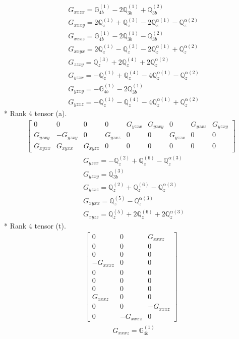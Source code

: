 \documentclass[fleqn,8pt,landscape]{jsarticle}
\begin{document}
\begin{align*}
& G_{xxzx} = \mathbb{G}_{4b}^{(1)} - 2 \mathbb{Q}_{3b}^{(1)} + \mathbb{Q}_{3b}^{(2)} \\
& G_{xxxy} = 2 \mathbb{Q}_{z}^{(1)} + \mathbb{Q}_{z}^{(3)} - 2 \mathbb{Q}_{z}^{\alpha(1)} - \mathbb{Q}_{z}^{\alpha(2)} \\
& G_{xxxz} = \mathbb{G}_{4b}^{(1)} - 2 \mathbb{Q}_{3b}^{(1)} - \mathbb{Q}_{3b}^{(2)} \\
& G_{xxyx} = 2 \mathbb{Q}_{z}^{(1)} - \mathbb{Q}_{z}^{(3)} - 2 \mathbb{Q}_{z}^{\alpha(1)} + \mathbb{Q}_{z}^{\alpha(2)} \\
& G_{zzxy} = \mathbb{Q}_{z}^{(3)} + 2 \mathbb{Q}_{z}^{(4)} + 2 \mathbb{Q}_{z}^{\alpha(2)} \\
& G_{yzzx} = - \mathbb{Q}_{z}^{(1)} + \mathbb{Q}_{z}^{(4)} - 4 \mathbb{Q}_{z}^{\alpha(1)} - \mathbb{Q}_{z}^{\alpha(2)} \\
& G_{yzxy} = - \mathbb{G}_{4b}^{(1)} - 2 \mathbb{Q}_{3b}^{(1)} \\
& G_{yzxz} = - \mathbb{Q}_{z}^{(1)} - \mathbb{Q}_{z}^{(4)} - 4 \mathbb{Q}_{z}^{\alpha(1)} + \mathbb{Q}_{z}^{\alpha(2)}
\end{align*}
* Rank 4 tensor (a).
\begin{align*}
\begin{bmatrix} 0 & 0 & 0 & 0 & G_{yzzx} & G_{yzxy} & 0 & G_{yzxz} & G_{yzxy} \\ G_{yzxy} & - G_{yzxy} & 0 & G_{yzxz} & 0 & 0 & G_{yzzx} & 0 & 0 \\ G_{xyxx} & G_{xyxx} & G_{xyzz} & 0 & 0 & 0 & 0 & 0 & 0 \end{bmatrix}
\end{align*}
\begin{align*}
& G_{yzzx} = - \mathbb{Q}_{z}^{(2)} + \mathbb{Q}_{z}^{(6)} - \mathbb{Q}_{z}^{\alpha(3)} \\
& G_{yzxy} = \mathbb{Q}_{3b}^{(3)} \\
& G_{yzxz} = \mathbb{Q}_{z}^{(2)} + \mathbb{Q}_{z}^{(6)} - \mathbb{Q}_{z}^{\alpha(3)} \\
& G_{xyxx} = \mathbb{Q}_{z}^{(5)} - \mathbb{Q}_{z}^{\alpha(3)} \\
& G_{xyzz} = \mathbb{Q}_{z}^{(5)} + 2 \mathbb{Q}_{z}^{(6)} + 2 \mathbb{Q}_{z}^{\alpha(3)}
\end{align*}
* Rank 4 tensor (t).
\begin{align*}
\begin{bmatrix} 0 & 0 & G_{xxxz} \\ 0 & 0 & 0 \\ 0 & 0 & 0 \\ - G_{xxxz} & 0 & 0 \\ 0 & 0 & 0 \\ 0 & 0 & 0 \\ 0 & 0 & 0 \\ G_{xxxz} & 0 & 0 \\ 0 & 0 & - G_{xxxz} \\ 0 & - G_{xxxz} & 0 \end{bmatrix}
\end{align*}
\begin{align*}
& G_{xxxz} = \mathbb{G}_{4b}^{(1)}
\end{align*}
\end{document}

